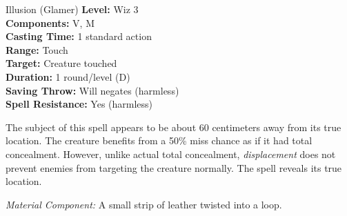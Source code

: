 {Illusion (Glamer)}
{
	\textbf{Level:}
	Wiz 3\\
	\textbf{Components:}
	V, M\\
	\textbf{Casting Time:}
	1 standard action\\
	\textbf{Range:}
	Touch\\
	\textbf{Target:}
	Creature touched\\
	\textbf{Duration:}
	1 round/level (D)\\
	\textbf{Saving Throw:}
	Will negates (harmless)\\
	\textbf{Spell Resistance:}
	Yes (harmless)\\
}
{
	The subject of this spell appears to be about 60 centimeters away from its true location. The creature benefits from a 50\% miss chance as if it had total concealment. However, unlike actual total concealment, \emph{displacement} does not prevent enemies from targeting the creature normally. The spell  reveals its true location.

	\textit{Material Component:}
	A small strip of leather twisted into a loop.

}
